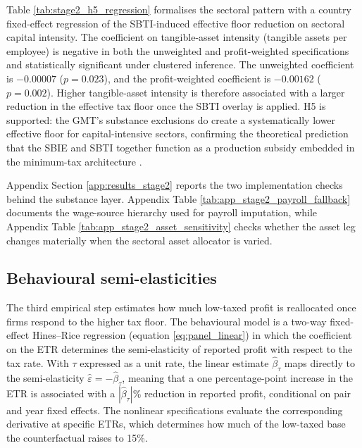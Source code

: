 \documentclass[11pt,a4paper]{article}
\begin{document}


Table \ref{tab:stage2_h5_regression} formalises the sectoral pattern with a country fixed-effect regression of the SBTI-induced effective floor reduction on sectoral capital intensity. The coefficient on tangible-asset intensity (tangible assets per employee) is negative in both the unweighted and profit-weighted specifications and statistically significant under clustered inference. The unweighted coefficient is $-0.00007$ ($p=0.023$), and the profit-weighted coefficient is $-0.00162$ ($p=0.002$). Higher tangible-asset intensity is therefore associated with a larger reduction in the effective tax floor once the SBTI overlay is applied. H5 is supported: the GMT's substance exclusions do create a systematically lower effective floor for capital-intensive sectors, confirming the theoretical prediction that the SBIE and SBTI together function as a production subsidy embedded in the minimum-tax architecture \citep{schjelderup2024}. 

Appendix Section \ref{app:results_stage2} reports the two implementation checks behind the substance layer. Appendix Table \ref{tab:app_stage2_payroll_fallback} documents the wage-source hierarchy used for payroll imputation, while Appendix Table \ref{tab:app_stage2_asset_sensitivity} checks whether the asset leg changes materially when the sectoral asset allocator is varied.


\subsection{Behavioural semi-elasticities}\label{sec:results_stage3}

The third empirical step estimates how much low-taxed profit is reallocated once firms respond to the higher tax floor. The behavioural model is a two-way fixed-effect Hines--Rice regression (equation \ref{eq:panel_linear}) in which the coefficient on the ETR determines the semi-elasticity of reported profit with respect to the tax rate. With $\tau$ expressed as a unit rate, the linear estimate $\hat{\beta}_{\tau}$ maps directly to the semi-elasticity $\hat{\varepsilon}=-\hat{\beta}_{\tau}$, meaning that a one percentage-point increase in the ETR is associated with a $|\hat{\beta}_{\tau}|$\% reduction in reported profit, conditional on pair and year fixed effects. The nonlinear specifications evaluate the corresponding derivative at specific ETRs, which determines how much of the low-taxed base the counterfactual raises to 15\%.
\end{document}
